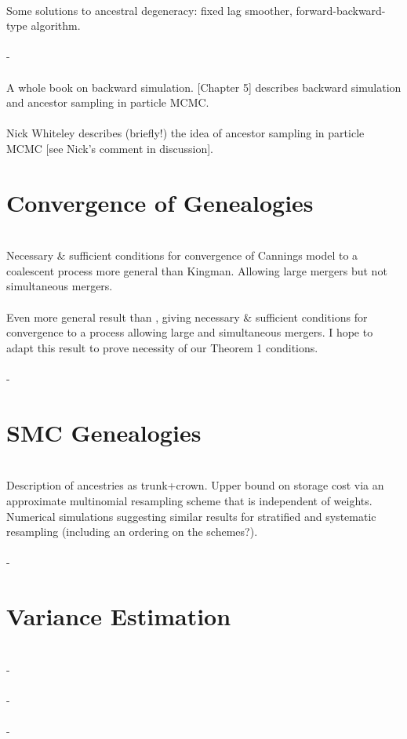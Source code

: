 \documentclass{article}
\begin{document}
\textbf{\citet{kitagawa1996}}\\
Some solutions to ancestral degeneracy: fixed lag smoother, forward-backward-type algorithm.
\\[5pt]
\textbf{\citet{doucet2009}}\\
-
\\[5pt]
\textbf{\citet{lindsten2013}}\\
A whole book on backward simulation. [Chapter 5] describes backward simulation and ancestor sampling in particle MCMC.
\\[5pt]
\textbf{\citet{andrieu2010}}\\
Nick Whiteley describes (briefly!) the idea of ancestor sampling in particle MCMC [see Nick's comment in discussion].

\section*{Convergence of Genealogies}

\textbf{\citet{mohle1998}}\\
Necessary \& sufficient conditions for convergence of Cannings model to a coalescent process more general than Kingman. Allowing large mergers but not simultaneous mergers.
\\[5pt]
\textbf{\citet{mohle2001}}\\
Even more general result than \citet{mohle1998}, giving necessary \& sufficient conditions for convergence to a process allowing large and simultaneous mergers. I hope to adapt this result to prove necessity of our Theorem 1 conditions.
\\[5pt]
\textbf{\citet{mohle1999}}\\
-

\section*{SMC Genealogies}

\textbf{\citet{jacob2015}}\\
Description of ancestries as trunk+crown. Upper bound on storage cost via an approximate multinomial resampling scheme that is independent of weights. Numerical simulations suggesting similar results for stratified and systematic resampling (including an ordering on the schemes?). 
\\[5pt]
\textbf{\citet{koskela2018}}\\
-

\section*{Variance Estimation}

\textbf{\citet{chan2013}}\\
-
\\[5pt]
\textbf{\citet{lee2018}}\\
-
\\[5pt]
\textbf{\citet{olsson2019}}\\
-


\end{document}
